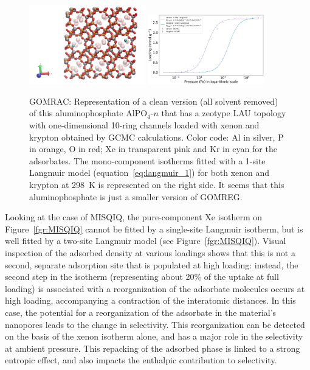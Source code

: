 \documentclass[main.tex]{subfiles}
\begin{document}
\begin{figure}[ht]
  \centering
    \includegraphics[width=0.45\textwidth]{figures/2-thermo/GOMRAC_clean.jpg}
    \includegraphics[width=0.45\textwidth]{figures/2-thermo/GOMRAC_clean_isotherm_xenon_krypton_298K.jpg}
    \caption{GOMRAC: Representation of a clean version (all solvent removed) of this aluminophosphate AlPO$_4$-$n$ that has a zeotype LAU topology with one-dimensional 10-ring channels loaded with xenon and krypton obtained by GCMC calculations. Color code: Al in silver, P in orange, O in red; Xe in transparent pink and Kr in cyan for the adsorbates. The mono-component isotherms fitted with a 1-site Langmuir model (equation~\ref{eq:langmuir_1}) for both xenon and krypton at \SI{298}{\kelvin} is represented on the right side. It seems that this aluminophosphate is just a smaller version of GOMREG.}\label{fgr:SI:examples:GOMRAC}
  \end{figure}

Looking at the case of MISQIQ, the pure-component Xe isotherm on Figure~\ref{fgr:MISQIQ} cannot be fitted by a single-site Langmuir isotherm, but is well fitted by a two-site Langmuir model (see Figure~\ref{fgr:MISQIQ}). Visual inspection of the adsorbed density at various loadings shows that this is not a second, separate adsorption site that is populated at high loading: instead, the second step in the isotherm (representing about {20\%} of the uptake at full loading) is associated with a reorganization of the adsorbate molecules occurs at high loading, accompanying a contraction of the interatomic distances. In this case, the potential for a reorganization of the adsorbate in the material's nanopores leads to the change in selectivity. This reorganization can be detected on the basis of the xenon isotherm alone, and has a major role in the selectivity at ambient pressure. This repacking of the adsorbed phase is linked to a strong entropic effect, and also impacts the enthalpic contribution to selectivity.
\end{document}
